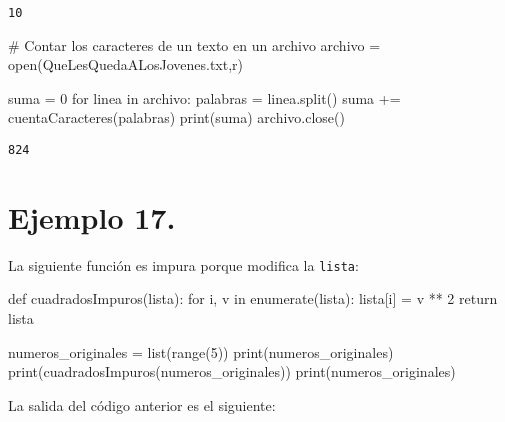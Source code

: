 \documentclass[
  letterpaper,
  DIV=11,
  numbers=noendperiod]{scrreprt}
\newenvironment{Shaded}{\begin{snugshade}}{\end{snugshade}}
\newcommand{\BuiltInTok}[1]{\textcolor[rgb]{0.00,0.23,0.31}{#1}}
\newcommand{\CommentTok}[1]{\textcolor[rgb]{0.37,0.37,0.37}{#1}}
\newcommand{\ControlFlowTok}[1]{\textcolor[rgb]{0.00,0.23,0.31}{#1}}
\newcommand{\DecValTok}[1]{\textcolor[rgb]{0.68,0.00,0.00}{#1}}
\newcommand{\KeywordTok}[1]{\textcolor[rgb]{0.00,0.23,0.31}{#1}}
\newcommand{\NormalTok}[1]{\textcolor[rgb]{0.00,0.23,0.31}{#1}}
\newcommand{\OperatorTok}[1]{\textcolor[rgb]{0.37,0.37,0.37}{#1}}
\newcommand{\StringTok}[1]{\textcolor[rgb]{0.13,0.47,0.30}{#1}}
\begin{document}
\begin{verbatim}
10
\end{verbatim}

\begin{Shaded}
\begin{Highlighting}[]
\CommentTok{\# Contar los caracteres de un texto en un archivo}
\NormalTok{archivo }\OperatorTok{=} \BuiltInTok{open}\NormalTok{(}\StringTok{\textquotesingle{}QueLesQuedaALosJovenes.txt\textquotesingle{}}\NormalTok{,}\StringTok{\textquotesingle{}r\textquotesingle{}}\NormalTok{)}

\NormalTok{suma }\OperatorTok{=} \DecValTok{0}
\ControlFlowTok{for}\NormalTok{ linea }\KeywordTok{in}\NormalTok{ archivo:}
\NormalTok{    palabras }\OperatorTok{=}\NormalTok{ linea.split()}
\NormalTok{    suma }\OperatorTok{+=}\NormalTok{ cuentaCaracteres(palabras)}
\BuiltInTok{print}\NormalTok{(suma)}
\NormalTok{archivo.close()}
\end{Highlighting}
\end{Shaded}

\begin{verbatim}
824
\end{verbatim}

\section{\texorpdfstring{\textbf{Ejemplo
17.}}{Ejemplo 17.}}\label{ejemplo-17.}

La siguiente función es impura porque modifica la \texttt{lista}:

\begin{Shaded}
\begin{Highlighting}[]
\KeywordTok{def}\NormalTok{ cuadradosImpuros(lista):}
    \ControlFlowTok{for}\NormalTok{ i, v }\KeywordTok{in} \BuiltInTok{enumerate}\NormalTok{(lista):}
\NormalTok{        lista[i] }\OperatorTok{=}\NormalTok{ v }\OperatorTok{**} \DecValTok{2}
    \ControlFlowTok{return}\NormalTok{ lista}

\NormalTok{numeros\_originales }\OperatorTok{=} \BuiltInTok{list}\NormalTok{(}\BuiltInTok{range}\NormalTok{(}\DecValTok{5}\NormalTok{))}
\BuiltInTok{print}\NormalTok{(numeros\_originales)}
\BuiltInTok{print}\NormalTok{(cuadradosImpuros(numeros\_originales))}
\BuiltInTok{print}\NormalTok{(numeros\_originales)}
\end{Highlighting}
\end{Shaded}

La salida del código anterior es el siguiente:
\end{document}

